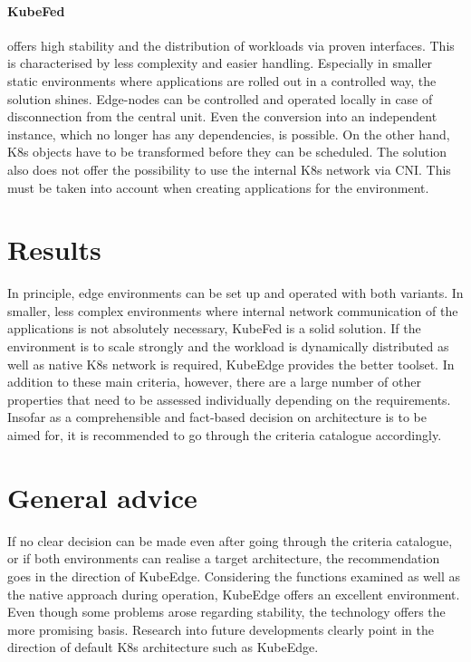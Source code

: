 \documentclass[MIC,Master,english]{twbook}%
\begin{document}
\paragraph{KubeFed} offers high stability and the distribution of workloads via proven interfaces. This is characterised by less complexity and easier handling. Especially in smaller static environments where applications are rolled out in a controlled way, the solution shines. Edge-nodes can be controlled and operated locally in case of disconnection from the central unit. Even the conversion into an independent instance, which no longer has any dependencies, is possible. On the other hand, \ac{K8s} objects have to be transformed before they can be scheduled. The solution also does not offer the possibility to use the internal \ac{K8s} network via \ac{CNI}. This must be taken into account when creating applications for the environment.

\section{Results}
\label{sec:conclusio}
In principle, edge environments can be set up and operated with both variants. In smaller, less complex environments where internal network communication of the applications is not absolutely necessary, KubeFed is a solid solution. If the environment is to scale strongly and the workload is dynamically distributed as well as native \ac{K8s} network is required, KubeEdge provides the better toolset. In addition to these main criteria, however, there are a large number of other properties that need to be assessed individually depending on the requirements. Insofar as a comprehensible and fact-based decision on architecture is to be aimed for, it is recommended to go through the criteria catalogue accordingly.

\section{General advice}
If no clear decision can be made even after going through the criteria catalogue, or if both environments can realise a target architecture, the recommendation goes in the direction of KubeEdge. Considering the functions examined as well as the native approach during operation, KubeEdge offers an excellent environment. Even though some problems arose regarding stability, the technology offers the more promising basis. Research into future developments clearly point in the direction of default K8s architecture such as KubeEdge.
\end{document}
